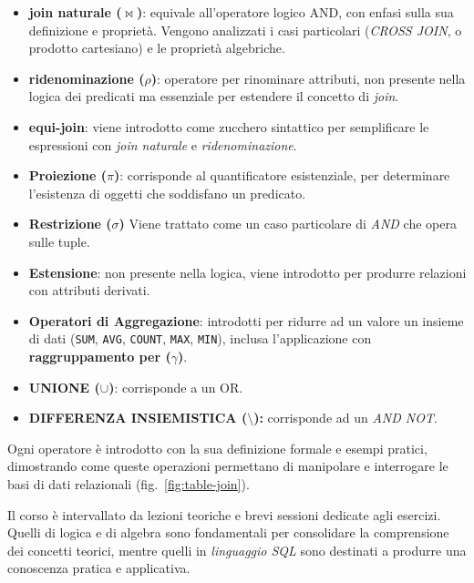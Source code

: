 \documentclass[withtimes]{easychair}
\theoremstyle{definition}
\begin{document}
\begin{itemize}
  \item \textbf{join naturale (\(\bowtie\))}: equivale all'operatore logico AND, con enfasi sulla sua definizione e proprietà. Vengono analizzati i casi particolari (\emph{CROSS JOIN}, o prodotto cartesiano) e le proprietà algebriche.
  \item \textbf{ridenominazione (\(\rho\))}: operatore per rinominare attributi, non presente nella logica dei predicati ma essenziale per estendere il concetto di \emph{join}.
  \item \textbf{equi-join}: viene introdotto come zucchero sintattico per semplificare le espressioni con \emph{join naturale} e \emph{ridenominazione}.
  \item \textbf{Proiezione (\(\pi\))}: corrisponde al quantificatore esistenziale, per determinare l'esistenza di oggetti che soddisfano un predicato.
  \item \textbf{Restrizione (\(\sigma\))} Viene trattato come un caso particolare di \emph{AND} che opera sulle tuple.
  \item \textbf{Estensione}: non presente nella logica, viene introdotto per produrre relazioni con attributi derivati.
  \item \textbf{Operatori di Aggregazione}: introdotti per ridurre ad un valore un insieme di dati (\texttt{SUM}, \texttt{AVG}, \texttt{COUNT}, \texttt{MAX}, \texttt{MIN}), inclusa l'applicazione con \textbf{raggruppamento per (\(\gamma\))}.
  \item \textbf{UNIONE (\(\cup\))}: corrisponde a un OR.
  \item \textbf{DIFFERENZA INSIEMISTICA (\(\setminus\)):} corrisponde ad un \emph{AND NOT}.
\end{itemize}

Ogni operatore è introdotto con la sua definizione formale e esempi pratici, dimostrando come queste operazioni permettano di manipolare e interrogare le basi di dati relazionali (fig.~\ref{fig:table-join}).

Il corso è intervallato da lezioni teoriche e brevi sessioni dedicate agli esercizi. Quelli di logica e di algebra sono fondamentali per consolidare la comprensione dei concetti teorici, mentre quelli in \emph{linguaggio SQL} sono destinati a produrre una conoscenza pratica e applicativa.
\end{document}
